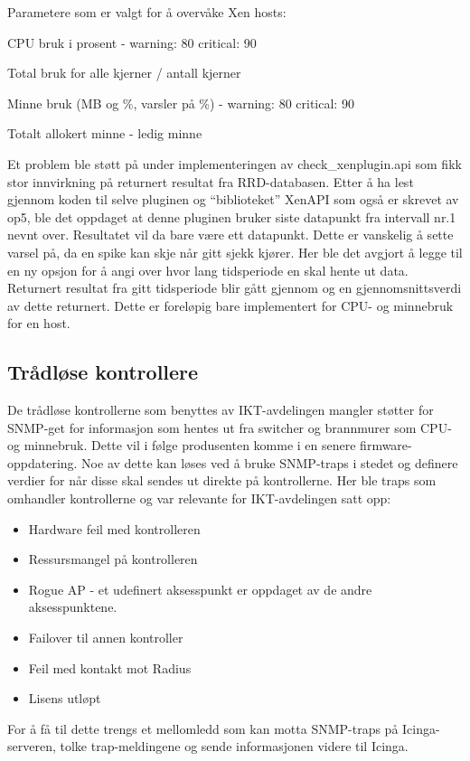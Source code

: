 Parametere som er valgt for å overvåke Xen hosts:

CPU bruk i prosent - warning: 80 critical: 90 

Total bruk for alle kjerner / antall kjerner

Minne bruk (MB og \%, varsler på \%) - warning: 80 critical: 90

Totalt allokert minne - ledig minne 

Et problem ble støtt på under implementeringen av check\_xenplugin.api som fikk stor innvirkning på returnert resultat fra RRD-databasen. Etter å ha lest gjennom koden til selve pluginen og “biblioteket” XenAPI som også er skrevet av op5, ble det oppdaget at denne pluginen bruker siste datapunkt fra intervall nr.1 nevnt over. Resultatet vil da bare være ett datapunkt. Dette er vanskelig å sette varsel på, da en spike kan skje når gitt sjekk kjører. Her ble det avgjort å legge til en ny opsjon for å angi over hvor lang tidsperiode en skal hente ut data. Returnert resultat fra gitt tidsperiode blir gått gjennom og en gjennomsnittsverdi av dette returnert. Dette er foreløpig bare implementert for CPU- og minnebruk for en host.

\subsection{Trådløse kontrollere}

De trådløse kontrollerne som benyttes av IKT-avdelingen mangler støtter for SNMP-get for informasjon som hentes ut fra switcher og brannmurer som  CPU- og minnebruk. Dette vil i følge produsenten komme i en senere firmware-oppdatering.
Noe av dette kan løses ved å bruke SNMP-traps i stedet og definere verdier for når disse skal sendes ut direkte på kontrollerne. Her ble traps som omhandler kontrollerne og var relevante for IKT-avdelingen satt opp:

\begin{itemize}
	\item Hardware feil med kontrolleren
	\item Ressursmangel på kontrolleren
	\item Rogue AP - et udefinert aksesspunkt er oppdaget av de andre aksesspunktene.
	\item Failover til annen kontroller
	\item Feil med kontakt mot Radius
	\item Lisens utløpt
\end{itemize}

For å få til dette trengs et mellomledd som kan motta SNMP-traps på Icinga-serveren, tolke trap-meldingene og sende informasjonen videre til Icinga. 

